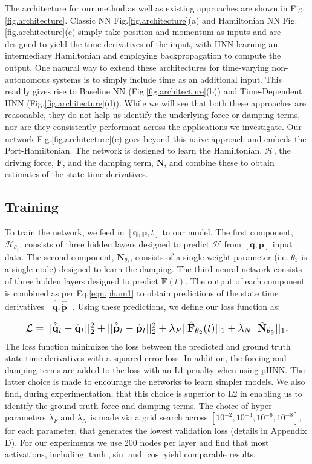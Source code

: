 \documentclass{article}
\begin{document}
The architecture for our method as well as existing approaches are shown in Fig.\ref{fig.architecture}. Classic NN Fig.\ref{fig.architecture}(a) and Hamiltonian NN Fig.\ref{fig.architecture}(c) \cite{greydanus_hamiltonian_2019} simply take position and momentum as inputs and are designed to yield the time derivatives of the input, with HNN learning an intermediary Hamiltonian and employing backpropagation to compute the output. One natural way to extend these architectures for time-varying non-autonomous systems is to simply include time as an additional input. This readily gives rise to Baseline NN (Fig.\ref{fig.architecture}(b)) and Time-Dependent HNN (Fig.\ref{fig.architecture}(d)). While we will see that both these approaches are reasonable, they do not help us identify the underlying force or damping terms, nor are they consistently performant across the applications we investigate. Our network Fig.\ref{fig.architecture}(e) goes beyond this naive approach and embeds the Port-Hamiltonian. The network is designed to learn the Hamiltonian, $\mathcal{H}$, the driving force, $\mathbf{F}$, and the damping term, $\mathbf{N}$, and combine these to obtain estimates of the state time derivatives. 

\subsection{Training}
To train the network, we feed in $ [\mathbf{q},\mathbf{p},t]$ to our model. The first component, $\mathcal{H}_{\theta_1}$, consists of three hidden layers designed to predict $\mathcal{H}$ from $[\mathbf{q},\mathbf{p}]$ input data. The second component, $\mathbf{N}_{\theta_3}$, consists of a single weight parameter (i.e. $\theta_3$ is a single node) designed to learn the damping. The third neural-network consists of three hidden layers designed to predict $\mathbf{F}(t)$. The output of each component is combined as per Eq.\ref{eqn.pham1} to obtain predictions of the state time derivatives $[\hat{\dot{\mathbf{q}}},\hat{\dot{\mathbf{p}}}]$. Using these predictions, we define our loss function as:
\begin{equation}
\label{eqn.loss}
\resizebox{0.9\columnwidth}{!}{%
  $\mathcal{L} =|| \hat{\dot{\mathbf{q}}}_t - \dot{\mathbf{q}}_t ||_2^2 +
|| \hat{\dot{\mathbf{p}}}_t -\dot{\mathbf{p}}_t ||_2^2 + \lambda_F|| \hat{\mathbf{F}}_{\theta_2} (t)||_1 + \lambda_N||\hat{\mathbf{N}}_{\theta_3}||_1$.%
}
\end{equation}
The loss function minimizes the loss between the predicted and ground truth state time derivatives with a squared error loss. In addition, the forcing and damping terms are added to the loss with an L1 penalty when using pHNN. The latter choice is made to encourage the networks to learn simpler models. We also find, during experimentation, that this choice is superior to L2 in enabling us to identify the ground truth force and damping terms. The choice of hyper-parameters $\lambda_F$ and $\lambda_{N}$ is made via a grid search across $[10^{-2},10^{-4},10^{-6},10^{-8}]$, for each parameter, that generates the lowest validation loss (details in Appendix D). For our experiments we use 200 nodes per layer and find that most activations, including $\tanh$,$\sin$ and $\cos$ yield comparable results. 
\end{document}
